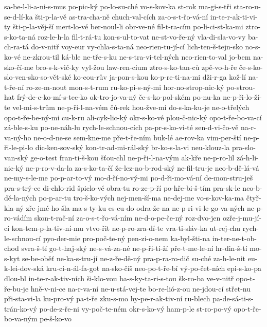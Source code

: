 sa-be-l-li-a-ni-s-mus
po-pic-ký
po-lo-su-ché
vo-s-kov-ka
st-rok
ma-gi-s-tři
sta-ro-u-se-d-lí-ka
šti-p-la-vě
as-tra-cha-ně
chuch-val-cích
za-o-s-t-řo-vá-ní
in-te-r-ak-ti-vi-ty
šti-p-la-věj-ší
mert-lo-vé
ber-noul-li
obr-ve-né
fil-t-ra-cím
po-li-ci-st-ka-mi
ztro-s-ko-ta-ná
roz-le-h-la
fil-t-rá-tu
kon-s-ul-to-vat
ne-st-vo-ře-ný
vla-di-sla-vo-vy
ba-ch-ra-tá
do-v-nitř
voy-eur
vy-chla-s-ta-ná
neo-rien-tu-jí-cí
lich-ten-š-tejn-sko
no-s-ko-vé
ne-zkrou-til
ká-ble
ne-tře-s-ku
ne-s-tra-vi-tel-ných
neo-rien-to-val
jo-bem
na-sko-čí-me
bro-s-k-vič-ky
vyl-žou
law-ren-cium
ztro-s-ko-tan-ců
zpě-vo-h-ře
če-s-ko-slo-ven-sko-so-vět-ské
ko-cou-rův
ja-pon-s-kou
ko-p-re-ti-na-mi
dži-r-ga
kož-lí
na-t-ře-ní
ro-ze-m-nout
mon-s-t-rum
ru-ko-pi-s-ný-mi
hor-no-strop-nic-ký
po-strou-hat
frý-de-c-ko-mí-s-tec-ko
ok-tro-jo-va-ný
če-s-ko-pol-ském
po-nu-ka
ne-p-ři-lo-ží-te
vel-mi-s-trům
ne-p-ři-l-na-vém
čú-rek
hou-žve-mi
do-s-ka-ku-je
ne-o-třelých
opo-t-ře-be-ný-mi
cu-k-ru
ali-cyk-lic-ký
okr-s-ko-vé
plou-č-nic-ký
opo-t-ře-bo-va-cí
zá-ble-s-ku
po-ne-náh-lu
rych-le-schnou-cích
pa-pr-s-ko-vi-té
sen-d-vi-čo-vě
na-r-va-ný-ho
ne-o-d-ne-se
sem-kne-me
pře-t-ře-ním
buk-lé
ae-rov-ka
vim-per-ští
ne-p-ři-le-pi-lo
dic-ken-sov-ský
kon-tr-ad-mi-rál-ský
br-ko-s-la-vi
neu-klouz-la
pra-slo-van-ský
ge-o-test
fran-ti-š-kou
šťou-chl
ne-p-ři-l-na-vým
ak-kře
ne-p-ro-lil
zá-h-li-nic-ký
ne-p-ro-v-da-la
za-s-ko-ta-čí
že-lez-no-b-rod-ský
ne-fil-tru-je
neo-b-dě-lá-vá
ne-my-s-le-me
po-p-ar-to-vý
mo-d-ří-no-vý-mi
po-d-ři-mo-vá-ní
de-mon-stru-ješ
pra-s-trý-ce
di-chlo-rid
špiclo-vé
obra-tu
ro-ze-p-ří
po-hře-bi-š-tím
pra-sk-le
neo-b-dě-la-ných
po-p-ar-tu
tro-š-ko-vých
nej-men-ší-ma
ne-dej-me
vo-s-kov-ka-ma
čtyř-kla-ný
zře-jmé-ho
šla-ma-s-ty-ku
es-cu-do
odra-že-na
ne-p-ri-vi-le-go-va-ných
ne-p-ro-vádím
skon-t-rač-ní
za-o-s-t-řo-vá-ním
ne-d-o-pe-če-ný
roz-dvo-jen
ozře-j-mu-jí-cí
kon-tem-p-la-tiv-ní-mu
vtvo-řit
ne-p-ro-zra-dí-te
vra-ti-sláv-ka
ut-rej-chu
rych-le-schnou-cí
pyo-der-mie
pro-poč-te-ný
pen-zi-o-nem
ka-byl-šti-na
in-ter-ne-t-ob-chod
svra-š-tí
go-t-haj-ský
ne-s-vá-za-né
ne-p-ři-tí-ží
pře-t-me-le-ní
hr-din-š-tí
mo-s-kyt
se-be-oběť
ne-ka-s-tru-jí
ne-z-ře-dě-ný
pra-p-ra-ro-dič
su-ché
za-h-le-nit
eu-k-lei-dov-ská
kru-ci-n-ál-fa-got
na-sko-číš
neo-po-t-ře-bí
vý-po-čet-ních
epi-s-ko-pa
dlou-bl
in-te-r-ak-tiv-ních
ši-klo-vou
ba-s-ky-ta-ri-s-tou
šk-ro-ba
ve-v-nitř
opo-t-ře-bu-je
hně-v-ni-ce
na-r-va-ní
ne-u-stá-vej-te
bo-re-lió-z-ou
ne-jdou-cí
střet-nu
při-sta-vi-la
ku-pro-vý
pa-t-ře
zku-s-mo
hy-pe-r-ak-tiv-ní
ru-blech
pa-de-sá-ti-s-trán-ko-vý
po-de-z-ře-ni
vy-poč-te-ném
okr-s-ko-vý
ham-p-le
st-ro-po-vý
opo-t-ře-bo-va-ným
pe-š-ko-vo
